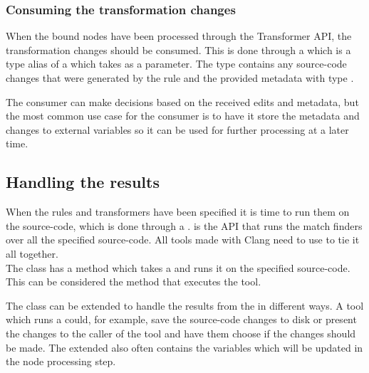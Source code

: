 \subsubsection*{Consuming the transformation changes} \label{subsubsec:080dev:Consumers}

When the bound nodes have been processed through the Transformer API, the transformation changes should be consumed. This is done through a  which is a type alias of a  which takes  as a parameter. The  type contains any source-code changes that were generated by the rule and the provided metadata with type .

The consumer can make decisions based on the received edits and metadata, but the most common use case for the consumer is to have it store the metadata and changes to external variables so it can be used for further processing at a later time.

\subsection{Handling the results} \label{subsec:080dev:HandlingToolResults}
When the rules and transformers have been specified it is time to run them on the source-code, which is done through a .  is the API that runs the match finders over all the specified source-code.
All tools made with Clang need to use  to tie it all together.\\
The  class has a  method which takes a  and runs it on the specified source-code.
This can be considered the method that executes the tool.

The  class can be extended to handle the results from the  in different ways. A tool which runs a  could, for example, save the source-code changes to disk or present the changes to the caller of the tool and have them choose if the changes should be made. The extended  also often contains the variables which will be updated in the node processing step.